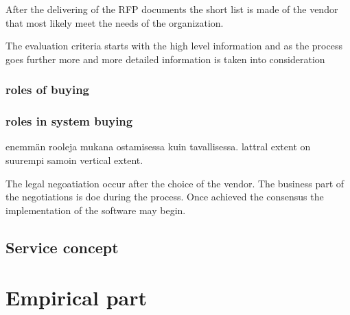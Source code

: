 \documentclass[12pt,a4paper,oneside,pdftex]{report}
\begin{document}
{{After the delivering of the RFP documents the short list is made of the vendor that most likely meet the needs of the organization. 

The evaluation criteria starts with the high level information and as the process goes further more and more detailed information is taken into consideration


\subsection{roles of buying}

\subsection{roles in system buying}

enemmän rooleja mukana ostamisessa kuin tavallisessa. lattral extent on suurempi samoin vertical extent. 

The legal negoatiation occur after the choice of the vendor. The business part of the negotiations is doe during the process. Once achieved the consensus the implementation of the software may begin. 






\section{Service concept}

% 

\chapter{Empirical part}
\label{chapter:methods}
}}
\end{document}

